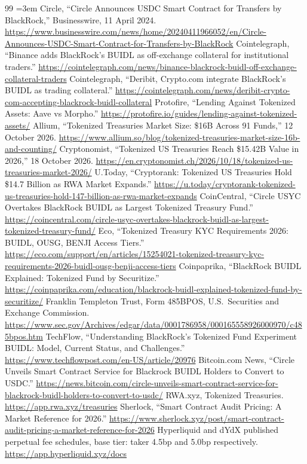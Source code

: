 \documentclass[11pt,a4paper]{article}
\begin{document}
\begin{thebibliography}{99}
\footnotesize\sloppy\emergencystretch=3em
 Circle, ``Circle Announces USDC Smart Contract for Transfers by BlackRock,''
Businesswire, 11 April 2024. \url{https://www.businesswire.com/news/home/20240411966052/en/Circle-Announces-USDC-Smart-Contract-for-Transfers-by-BlackRock}
 Cointelegraph, ``Binance adds BlackRock's BUIDL as off-exchange collateral for
institutional traders.'' \url{https://cointelegraph.com/news/binance-blackrock-buidl-off-exchange-collateral-traders}
 Cointelegraph, ``Deribit, Crypto.com integrate BlackRock's BUIDL as trading
collateral.'' \url{https://cointelegraph.com/news/deribit-crypto-com-accepting-blackrock-buidl-collateral}
 Protofire, ``Lending Against Tokenized Assets: Aave vs Morpho.''
\url{https://protofire.io/guides/lending-against-tokenized-assets/}
 Allium, ``Tokenized Treasuries Market Size: \$16B Across 91 Funds,'' 12 October 2026.
\url{https://www.allium.so/blog/tokenized-treasuries-market-size-16b-and-counting/}
 Cryptonomist, ``Tokenized US Treasuries Reach \$15.42B Value in 2026,''
18 October 2026. \url{https://en.cryptonomist.ch/2026/10/18/tokenized-us-treasuries-market-2026/}
 U.Today, ``Cryptorank: Tokenized US Treasuries Hold \$14.7 Billion as RWA Market
Expands.'' \url{https://u.today/cryptorank-tokenized-us-treasuries-hold-147-billion-as-rwa-market-expands}
 CoinCentral, ``Circle USYC Overtakes BlackRock BUIDL as Largest Tokenized
Treasury Fund.'' \url{https://coincentral.com/circle-usyc-overtakes-blackrock-buidl-as-largest-tokenized-treasury-fund/}
 Eco, ``Tokenized Treasury KYC Requirements 2026: BUIDL, OUSG, BENJI Access Tiers.''
\url{https://eco.com/support/en/articles/15254021-tokenized-treasury-kyc-requirements-2026-buidl-ousg-benji-access-tiers}
 Coinpaprika, ``BlackRock BUIDL Explained: Tokenized Fund by Securitize.''
\url{https://coinpaprika.com/education/blackrock-buidl-explained-tokenized-fund-by-securitize/}
 Franklin Templeton Trust, Form 485BPOS, U.S.\ Securities and Exchange Commission.
\url{https://www.sec.gov/Archives/edgar/data/0001786958/000165558926000970/c485bpos.htm}
 TechFlow, ``Understanding BlackRock's Tokenized Fund Experiment BUIDL: Model,
Current Status, and Challenges.'' \url{https://www.techflowpost.com/en-US/article/20976}
 Bitcoin.com News, ``Circle Unveils Smart Contract Service for Blackrock BUIDL
Holders to Convert to USDC.'' \url{https://news.bitcoin.com/circle-unveils-smart-contract-service-for-blackrock-buidl-holders-to-convert-to-usdc/}
 RWA.xyz, Tokenized Treasuries. \url{https://app.rwa.xyz/treasuries}
 Sherlock, ``Smart Contract Audit Pricing: A Market Reference for 2026.''
\url{https://www.sherlock.xyz/post/smart-contract-audit-pricing-a-market-reference-for-2026}
 Hyperliquid and dYdX published perpetual fee schedules, base tier: taker 4.5bp and
5.0bp respectively. \url{https://app.hyperliquid.xyz/docs}
\end{thebibliography}
\end{document}
